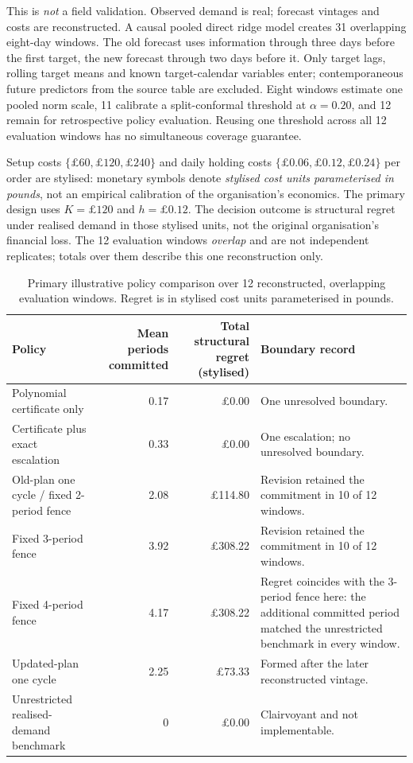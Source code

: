 \documentclass[11pt]{article}
\theoremstyle{definition}
\begin{document}
This is \emph{not} a field validation. Observed demand is real; forecast vintages and costs are reconstructed. A causal pooled direct ridge model creates 31 overlapping eight-day windows. The old forecast uses information through three days before the first target, the new forecast through two days before it. Only target lags, rolling target means and known target-calendar variables enter; contemporaneous future predictors from the source table are excluded. Eight windows estimate one pooled norm scale, 11 calibrate a split-conformal threshold at $\alpha=0.20$, and 12 remain for retrospective policy evaluation. Reusing one threshold across all 12 evaluation windows has no simultaneous coverage guarantee.

Setup costs $\{\pounds60,\pounds120,\pounds240\}$ and daily holding costs $\{\pounds0.06,\pounds0.12,\pounds0.24\}$ per order are stylised: monetary symbols denote \emph{stylised cost units parameterised in pounds}, not an empirical calibration of the organisation's economics. The primary design uses $K=\pounds120$ and $h=\pounds0.12$. The decision outcome is structural regret under realised demand in those stylised units, not the original organisation's financial loss. The 12 evaluation windows \emph{overlap} and are not independent replicates; totals over them describe this one reconstruction only.

\begin{table}[t]
\centering
\caption{Primary illustrative policy comparison over 12 reconstructed, overlapping evaluation windows. Regret is in stylised cost units parameterised in pounds.}
\label{tab:case}
\small
\begin{tabularx}{\linewidth}{@{}XrrX@{}}
\toprule
Policy & Mean periods committed & Total structural regret (stylised) & Boundary record \\
\midrule
Polynomial certificate only & 0.17 & \pounds0.00 & One unresolved boundary. \\
Certificate plus exact escalation & 0.33 & \pounds0.00 & One escalation; no unresolved boundary. \\
Old-plan one cycle / fixed 2-period fence & 2.08 & \pounds114.80 & Revision retained the commitment in 10 of 12 windows. \\
Fixed 3-period fence & 3.92 & \pounds308.22 & Revision retained the commitment in 10 of 12 windows. \\
Fixed 4-period fence & 4.17 & \pounds308.22 & Regret coincides with the 3-period fence here: the additional committed period matched the unrestricted benchmark in every window. \\
Updated-plan one cycle & 2.25 & \pounds73.33 & Formed after the later reconstructed vintage. \\
Unrestricted realised-demand benchmark & 0 & \pounds0.00 & Clairvoyant and not implementable. \\
\bottomrule
\end{tabularx}
\end{table}
\end{document}
